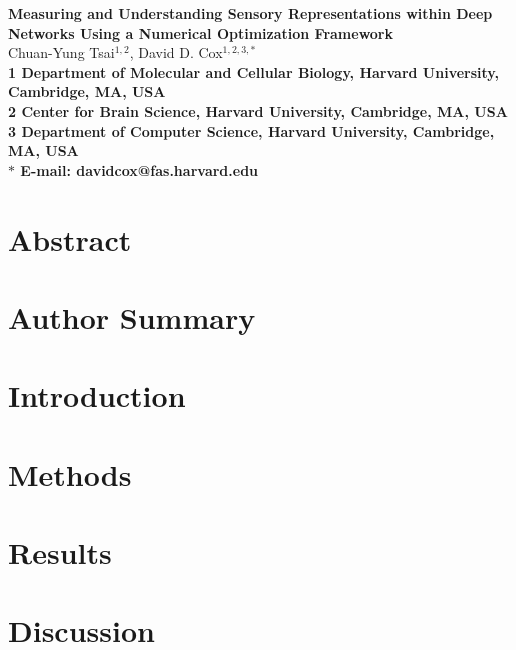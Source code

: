 \begin{flushleft}
{\Large
\textbf{Measuring and Understanding Sensory Representations within Deep Networks Using a Numerical Optimization Framework}
}
\\
Chuan-Yung Tsai$^{1,2}$, 
David D. Cox$^{1,2,3,\ast}$
\\
\bf{1} Department of Molecular and Cellular Biology, Harvard University, Cambridge, MA, USA
\\
\bf{2} Center for Brain Science, Harvard University, Cambridge, MA, USA
\\
\bf{3} Department of Computer Science, Harvard University, Cambridge, MA, USA
\\
$\ast$ E-mail: davidcox@fas.harvard.edu
\end{flushleft}

\section*{Abstract}



\section*{Author Summary}

\section*{Introduction} 
\label{sec:intro}


\section*{Methods} 
\label{sec:methods}


\section*{Results} 
\label{sec:results}


\section*{Discussion} 
\label{sec:discussion}


